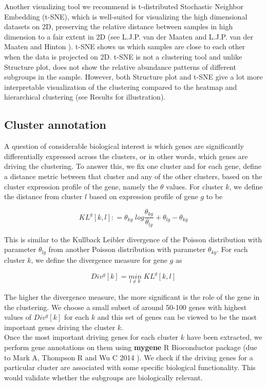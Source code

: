 Another visualizing tool we recommend is t-distributed Stochastic Neighbor Embedding (t-SNE), which is well-suited for visualizing the high dimensional datasets on 2D, preserving the relative distance between samples in high dimension to a fair extent in 2D (see L.J.P. van der Maaten \cite{Maaten2014} and L.J.P. van der Maaten and Hinton \cite{Maaten2008}). t-SNE shows us which samples are close to each other when the data is projected on 2D. t-SNE is not a clustering tool and unlike Structure plot, does not show the relative abundance patterns of different subgroups in the sample. However, both Structure plot and t-SNE give a lot more interpretable visualization of the clustering compared to the heatmap and hierarchical clustering (see Results for illustration).

\subsection{Cluster annotation}

A question of considerable biological interest is which genes are significantly differentially expressed across the clusters, or in other words, which genes are driving the clustering. To answer this, we fix one cluster and for each gene, define a distance metric between that cluster and any of the other clusters, based on the cluster expression profile of the gene, namely the $\theta$ values. For cluster $k$, we define the distance from cluster $l$ based on expression profile of gene $g$ to be 

$$ KL^{g} [k,l] : = \theta_{kg} \; log \frac{\theta_{kg}}{\theta_{lg}} + \theta_{lg} - \theta_{kg} $$

This is similar to the Kullback Leibler divergence of the Poisson distribution with parameter $ \theta_{lg}$ from another Poisson distribution with parameter $ \theta_{kg}$. For each cluster $k$, we define the divergence measure for gene $g$ as 

$$ Div^{g}[k] = \underset{l \neq k}{min} \; KL^{g} [k, l] $$

The higher the divergence measure, the more significant is the role of the gene in the clustering. We choose a small subset of around 50-100 genes with highest values of $Div^{g}[k]$ for each $k$ and this set of genes can be viewed to be the most important genes driving the cluster $k$.  \\[1 pt]

Once the most important driving genes for each cluster $k$ have been extracted, we perform gene annotations on them using \textbf{mygene} R Bioconductor package (due to Mark A, Thompson R and Wu C  2014 \cite{Thompson2014}). We check if the driving genes for a particular cluster are associated with some specific biological functionality. This would validate whether the subgroups are biologically relevant. 

